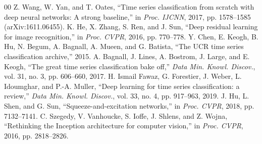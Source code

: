 \documentclass[conference]{IEEEtran}
\begin{document}
\begin{thebibliography}{00}
 Z. Wang, W. Yan, and T. Oates, ``Time series classification from scratch with deep neural networks: A strong baseline,'' in \textit{Proc. IJCNN}, 2017, pp. 1578--1585 (arXiv:1611.06455).
 K. He, X. Zhang, S. Ren, and J. Sun, ``Deep residual learning for image recognition,'' in \textit{Proc. CVPR}, 2016, pp. 770--778.
 Y. Chen, E. Keogh, B. Hu, N. Begum, A. Bagnall, A. Mueen, and G. Batista, ``The UCR time series classification archive,'' 2015.
 A. Bagnall, J. Lines, A. Bostrom, J. Large, and E. Keogh, ``The great time series classification bake off,'' \textit{Data Min. Knowl. Discov.}, vol. 31, no. 3, pp. 606--660, 2017.
 H. Ismail Fawaz, G. Forestier, J. Weber, L. Idoumghar, and P.-A. Muller, ``Deep learning for time series classification: a review,'' \textit{Data Min. Knowl. Discov.}, vol. 33, no. 4, pp. 917--963, 2019.
 J. Hu, L. Shen, and G. Sun, ``Squeeze-and-excitation networks,'' in \textit{Proc. CVPR}, 2018, pp. 7132--7141.
 C. Szegedy, V. Vanhoucke, S. Ioffe, J. Shlens, and Z. Wojna, ``Rethinking the Inception architecture for computer vision,'' in \textit{Proc. CVPR}, 2016, pp. 2818--2826.
\end{thebibliography}
\end{document}
